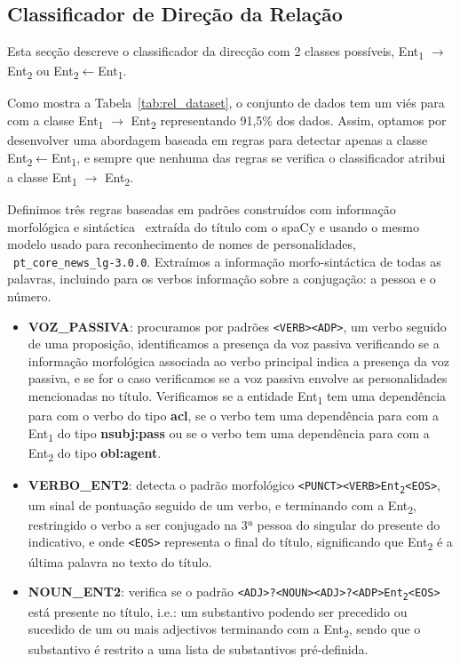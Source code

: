 \documentclass[a4paper, twocolumn, 11pt, twoside]{article}
\begin{document}
\subsection{Classificador de Direção da Relação}
\label{subsec:rel_direction}

Esta secção descreve o classificador da direcção com 2 classes possíveis, Ent\textsubscript{1} $\rightarrow$ Ent\textsubscript{2} ou Ent\textsubscript{2}$\leftarrow$Ent\textsubscript{1}. 

Como mostra a Tabela~\ref{tab:rel_dataset}, o conjunto de dados tem um viés para com a classe Ent\textsubscript{1} $\rightarrow$ Ent\textsubscript{2} representando 91,5\% dos dados. Assim, optamos por desenvolver uma abordagem baseada em regras para detectar apenas a classe Ent\textsubscript{2}$\leftarrow$Ent\textsubscript{1}, e sempre que nenhuma das regras se verifica o classificador atribui a classe Ent\textsubscript{1} $\rightarrow$ Ent\textsubscript{2}.

Definimos três regras baseadas em padrões construídos com informação morfológica e sintáctica~\citep{nivre-etal-2020-universal} extraída do título com o spaCy e usando o mesmo modelo usado para reconhecimento de nomes de personalidades, ~\texttt{pt\_core\_news\_lg-3.0.0}. Extraímos a informação morfo-sintáctica de todas as palavras, incluindo para os verbos informação sobre a conjugação: a pessoa e o número.

\begin{itemize}

\item \textbf{VOZ\_PASSIVA}: procuramos por padrões \texttt{<VERB><ADP>}, um verbo seguido de uma proposição, identificamos a presença da voz passiva verificando se a informação morfológica associada ao verbo principal indica a presença da voz passiva, e se for o caso verificamos se a voz passiva envolve as personalidades mencionadas no título. Verificamos se a entidade Ent\textsubscript{1} tem uma dependência para com o verbo do tipo \textbf{acl}, se o verbo tem uma dependência para com a Ent\textsubscript{1} do tipo \textbf{nsubj:pass} ou se o verbo tem uma dependência para com a Ent\textsubscript{2} do tipo \textbf{obl:agent}. 

\item \textbf{VERBO\_ENT2}: detecta o padrão morfológico \texttt{<PUNCT><VERB>Ent\textsubscript{2}<EOS>}, um sinal de pontuação seguido de um verbo, e terminando com a Ent\textsubscript{2}, restringido o verbo a ser conjugado na 3ª pessoa do singular do presente do indicativo, e onde \texttt{<EOS>} representa o final do título, significando que Ent\textsubscript{2} é a última palavra no texto do título.

\item \textbf{NOUN\_ENT2}: verifica se o padrão \texttt{<ADJ>?<NOUN><ADJ>?<ADP>Ent\textsubscript{2}<EOS>} está presente no título, i.e.: um substantivo podendo ser precedido ou sucedido de um ou mais adjectivos terminando com a Ent\textsubscript{2}, sendo que o substantivo é restrito a uma lista de substantivos pré-definida.
\end{itemize}
\end{document}
